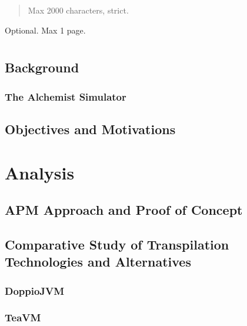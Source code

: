 \documentclass[12pt,a4paper,openright,twoside]{book}
\begin{document}
\frontmatter


\begin{abstract}
Max 2000 characters, strict.
\end{abstract}

\begin{acknowledgements} %
Optional. Max 1 page.
\end{acknowledgements}

\tableofcontents

\listoffigures

\lstlistoflistings

\mainmatter

\chapter{\introductionname}
\label{chap:introduction}
\section{Background}
\label{sec:background}
\subsection{The Alchemist Simulator}
\label{ssec:the-alchemist-simulator}
\section{Objectives and Motivations}
\label{sec:objectives-and-motivations}
\chapter{Analysis}
\label{chap:analysis}
\section{APM Approach and Proof of Concept}
\label{sec:apm-approach-and-proof-of-concept}
\section{Comparative Study of Transpilation Technologies and Alternatives}
\label{sec:comparative-study-of-transpilation-technologies-and-alternatives}
\subsection{DoppioJVM}
\label{ssec:doppiojvm}
\subsection{TeaVM}
\label{ssec:teavm}
\end{document}
